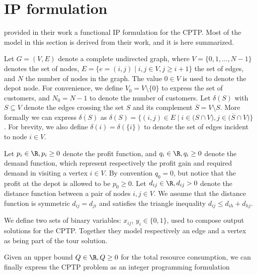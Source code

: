 \chapter{IP formulation}

\cite{Jepsen2014} provided in their work a functional IP formulation for the CPTP.
Most of the model in this section is derived from their work, and it is here summarized.

Let $G = \left(V, E \right)$ denote a complete undirected graph, where $V = \lbrace 0, 1, \dots, N - 1 \rbrace$ denotes the set of nodes,
$E = \lbrace  e = (i, j) \mid i,j \in V, j \ge i + 1 \rbrace$ the set of edges, and $N$ the number of nodes in the graph.
The value $0 \in V$ is used to denote the depot node.
For convenience, we define $V_0 = V \setminus \{0\}$ to express the set of customers, and $N_0 = N - 1$ to denote the number of customers.
Let $\delta(S)$ with $S \subseteq V$ denote the edges crossing the set $S$ and its complement $\overline{S} = V \setminus S$.
More formally we can express $\delta(S)$ as $\delta(S) = \lbrace (i, j) \in E \mid i \in \lparen S \cap V \rparen, j \in \lparen \overline{S} \cap V \rparen \rbrace$.
For brevity, we also define $\delta(i) = \delta(\{i\})$ to denote the set of edges incident to node $i \in V$.

Let $p_{i} \in \R, p_{i} \ge 0$ denote the profit function, and $q_{i} \in \R, q_{i} \ge 0$ denote the demand function, which represent respectively the profit gain and required demand in visiting a vertex $i \in V$.
By convention $q_0 = 0$, but notice that the profit at the depot is allowed to be $p_0 \ge 0$.
Let $d_{ij} \in \R, d_{ij} > 0$ denote the distance function between a pair of nodes  $i, j \in V$.
We assume that the distance function is symmetric $d_{ij} = d_{ji}$ and satisfies the triangle inequality $d_{ij} \le d_{ih} + d_{hj}$.

We define two sets of binary variables: $x_{ij}$, $y_{i} \in \lbrace 0, 1 \rbrace$, used to compose output solutions for the CPTP.
Together they model respectively an edge and a vertex as being part of the tour solution.

Given an upper bound $Q \in \R,Q \ge 0$ for the total resource consumption, we can finally express the CPTP problem as an integer programming formulation


